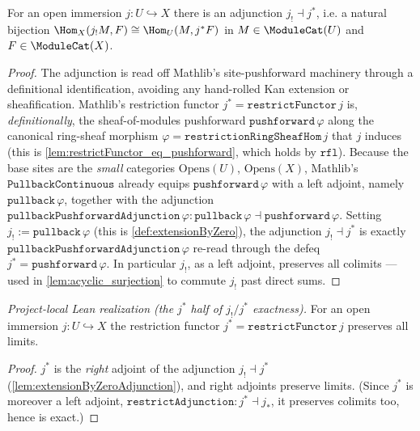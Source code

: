 \begin{lemma}
  \label{lem:extensionByZeroAdjunction}
  For an open immersion $j : U \hookrightarrow X$ there is an adjunction
  $j_! \dashv j^{*}$, i.e. a natural bijection
  $\Hom_X(j_! M, F) \cong \Hom_U(M, j^{*} F)$ in $M \in \ModuleCat(U)$ and
  $F \in \ModuleCat(X)$.
  \begin{proof}
    The adjunction is read off Mathlib's site-pushforward machinery through a
    definitional identification, avoiding any hand-rolled Kan extension or
    sheafification. Mathlib's restriction functor $j^{*} =
    \mathtt{restrictFunctor}\,j$ is, \emph{definitionally}, the sheaf-of-modules
    pushforward $\mathtt{pushforward}\,\varphi$ along the canonical ring-sheaf
    morphism $\varphi = \mathtt{restrictionRingSheafHom}\,j$ that $j$ induces (this
    is \cref{lem:restrictFunctor_eq_pushforward}, which holds by $\mathtt{rfl}$).
    Because the base sites are the \emph{small} categories $\mathrm{Opens}(U)$,
    $\mathrm{Opens}(X)$, Mathlib's $\mathtt{PullbackContinuous}$ already equips
    $\mathtt{pushforward}\,\varphi$ with a left adjoint, namely
    $\mathtt{pullback}\,\varphi$, together with the adjunction
    $\mathtt{pullbackPushforwardAdjunction}\,\varphi :
    \mathtt{pullback}\,\varphi \dashv \mathtt{pushforward}\,\varphi$. Setting
    $j_! := \mathtt{pullback}\,\varphi$ (this is \cref{def:extensionByZero}), the
    adjunction $j_! \dashv j^{*}$ is exactly
    $\mathtt{pullbackPushforwardAdjunction}\,\varphi$ re-read through the defeq
    $j^{*} = \mathtt{pushforward}\,\varphi$. In particular $j_!$, as a left
    adjoint, preserves all colimits — used in \cref{lem:acyclic_surjection} to
    commute $j_!$ past direct sums.
  \end{proof}
\end{lemma}

\begin{lemma}

  \label{lem:restrictFunctor_exact}
  \textit{Project-local Lean realization (the $j^{*}$ half of $j_!/j^{*}$ exactness).}
  For an open immersion $j : U \hookrightarrow X$ the restriction functor
  $j^{*} = \mathtt{restrictFunctor}\,j$ preserves all limits.
  \begin{proof}
    $j^{*}$ is the \emph{right} adjoint of the adjunction $j_! \dashv j^{*}$
    (\cref{lem:extensionByZeroAdjunction}), and right adjoints preserve limits.
    (Since $j^{*}$ is moreover a left adjoint, $\mathtt{restrictAdjunction} :
    j^{*} \dashv j_{*}$, it preserves colimits too, hence is exact.)
  \end{proof}
\end{lemma}

